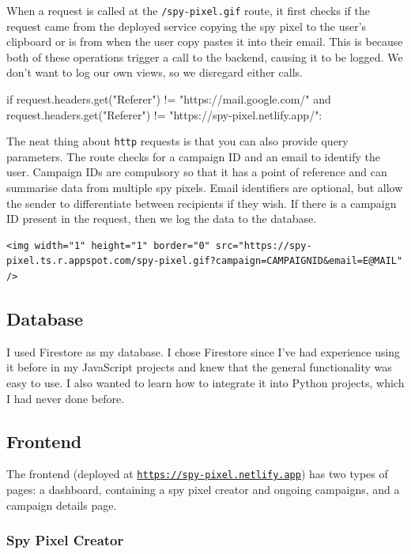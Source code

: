 \documentclass{article}
\begin{document}
When a request is called at the \texttt{/spy-pixel.gif} route, it first checks if the request came from the deployed service copying the spy pixel to the user's clipboard or is from when the user copy pastes it into their email. This is because both of these operations trigger a call to the backend, causing it to be logged. We don't want to log our own views, so we disregard either calls.

\begin{python}
if request.headers.get("Referer") != "https://mail.google.com/" and request.headers.get("Referer") != "https://spy-pixel.netlify.app/":
\end{python}

The neat thing about \texttt{http} requests is that you can also provide query parameters. The route checks for a campaign ID and an email to identify the user. Campaign IDs are compulsory so that it has a point of reference and can summarise data from multiple spy pixels. Email identifiers are optional, but allow the sender to differentiate between recipients if they wish. If there is a campaign ID present in the request, then we log the data to the database.

\begin{lstlisting}
<img width="1" height="1" border="0" src="https://spy-pixel.ts.r.appspot.com/spy-pixel.gif?campaign=CAMPAIGNID&email=E@MAIL" />
\end{lstlisting}

\subsection{Database}

I used Firestore as my database. I chose Firestore since I've had experience using it before in my JavaScript projects and knew that the general functionality was easy to use. I also wanted to learn how to integrate it into Python projects, which I had never done before.

\subsection{Frontend}

The frontend (deployed at \href{https://spy-pixel.netlify.app}{\texttt{https://spy-pixel.netlify.app}}) has two types of pages: a dashboard, containing a spy pixel creator and ongoing campaigns, and a campaign details page.

\subsubsection{Spy Pixel Creator}
\end{document}
